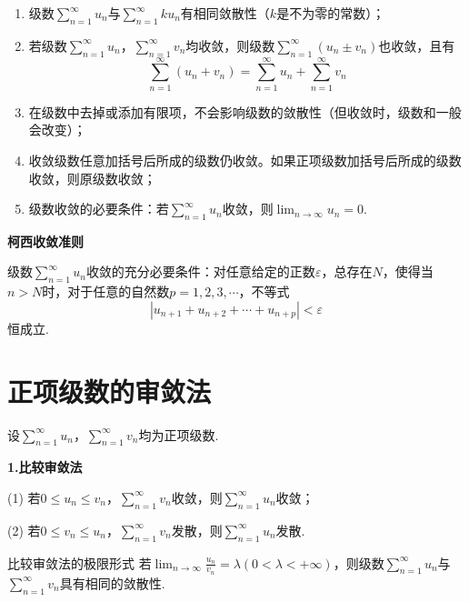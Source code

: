 \begin{property}
    \begin{enumerate}
        \item 级数$\displaystyle\sum_{n=1}^\infty u_n$与$\displaystyle\sum_{n=1}^\infty ku_n$有相同敛散性（$k$是不为零的常数）；
        
        \item 若级数$\displaystyle\sum_{n=1}^\infty u_n$，$\sum_{n=1}^\infty v_n$均收敛，则级数$\displaystyle\sum_{n=1}^\infty(u_n\pm v_n)$也收敛，且有
        \begin{equation*}
            \sum_{n=1}^\infty(u_n+v_n)=\sum_{n=1}^\infty u_n+\sum_{n=1}^\infty v_n
        \end{equation*}

        \item 在级数中去掉或添加有限项，不会影响级数的敛散性（但收敛时，级数和一般会改变）；
        
        \item 收敛级数任意加括号后所成的级数仍收敛。如果正项级数加括号后所成的级数收敛，则原级数收敛；
        
        \item 级数收敛的必要条件：若$\displaystyle\sum_{n=1}^\infty u_n$收敛，则$\displaystyle\lim_{n\rightarrow\infty}u_n=0$.
    \end{enumerate}
\end{property}

\textbf{柯西收敛准则}

级数$\sum_{n=1}^\infty u_n$收敛的充分必要条件：对任意给定的正数$\varepsilon$，总存在$N$，使得当$n>N$时，对于任意的自然数$p=1,2,3,\cdots$，不等式
\begin{equation*}
    |u_{n+1}+u_{n+2}+\cdots+u_{n+p}|<\varepsilon
\end{equation*}
恒成立.

\section{正项级数的审敛法}
设$\displaystyle\sum_{n=1}^\infty u_n$，$\displaystyle\sum_{n=1}^\infty v_n$均为正项级数.

\textbf{1.比较审敛法}

(1) 若$0\leq u_n\leq v_n$，$\displaystyle\sum_{n=1}^\infty v_n$收敛，则$\displaystyle\sum_{n=1}^\infty u_n$收敛；

(2) 若$0\leq v_n\leq u_n$，$\displaystyle\sum_{n=1}^\infty v_n$发散，则$\displaystyle\sum_{n=1}^\infty u_n$发散.

比较审敛法的极限形式 \quad 若$\displaystyle\lim_{n\rightarrow\infty}\frac{u_n}{v_n}=\lambda(0<\lambda<+\infty)$，则级数$\displaystyle\sum_{n=1}^\infty u_n$与$\displaystyle\sum_{n=1}^\infty v_n$具有相同的敛散性.

